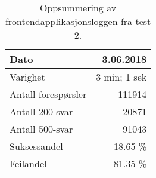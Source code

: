 \begin{table}[hbtp]
  \caption{Oppsummering av frontend\-applikasjons\-loggen fra test 2.}
  \begin{center}
    \begin{tabular}{ | l | r |}
      \hline
      Dato & 3.06.2018 \\ \hline
      Varighet & 3 min; 1 sek \\ \hline
      Antall forespørsler & 111914 \\ \hline
      Antall 200-svar & 20871 \\ \hline
      Antall 500-svar & 91043 \\ \hline
      Suksessandel & 18.65 \% \\ \hline
      Feilandel & 81.35 \% \\ \hline
    \end{tabular}
  \end{center}
  \label{frontend2}
\end{table}
